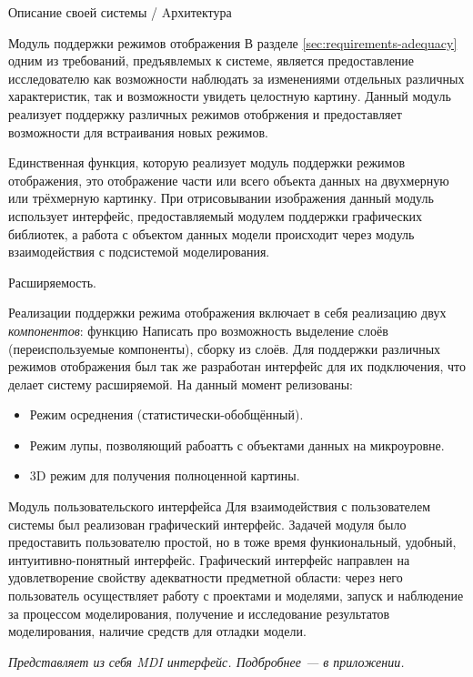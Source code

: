 \documentclass[a4paper,12pt]{extarticle}
\begin{document}
\begin{section}{Описание своей системы / Aрхитектура}
\begin{subsection}{Модуль поддержки режимов отображения}
    В разделе \ref{sec:requirements-adequacy} одним из требований, предъявлемых к системе, является предоставление исследователю как возможности наблюдать за изменениями отдельных различных характеристик, так и возможности увидеть целостную картину. Данный модуль реализует поддержку различных режимов отобржения и предоставляет возможности для встраивания новых режимов.

    Единственная функция, которую реализует модуль поддержки режимов отображения, это отображение части или всего объекта данных на двухмерную или трёхмерную картинку. При отрисовывании изображения данный модуль использует интерфейс, предоставляемый модулем поддержки графических библиотек, а работа с объектом данных модели происходит через модуль взаимодействия с подсистемой моделирования. 

    Расширяемость.

    Реализации поддержки режима отображения включает в себя реализацию двух \textit{компонентов}: функцию
    Написать про возможность выделение слоёв (переиспользуемые компоненты), сборку из слоёв.
    Для поддержки различных режимов отображения был так же разработан интерфейс для их подключения, что делает систему расширяемой. На данный момент релизованы:
    \begin{itemize}
        \item Режим осреднения (статистически-обобщённый).
        \item Режим лупы, позволяющий рабоатть с объектами данных на микроуровне.
        \item 3D режим для получения полноценной картины.
    \end{itemize}
\end{subsection}

\begin{subsection}{Модуль пользовательского интерфейса}
    Для взаимодействия с пользователем системы был реализован графический интерфейс. Задачей модуля было предоставить пользователю простой, но в тоже время функиональный, удобный, интуитивно-понятный интерфейс. Графический интерфейс направлен на удовлетворение свойству адекватности предметной области: через него пользователь осуществляет работу с проектами и моделями, запуск и наблюдение за процессом моделирования, получение и исследование результатов моделирования, наличие средств для отладки модели.
    
    \textit{Представляет из себя MDI интерфейс. Подбробнее --- в приложении.}
\end{subsection}

\end{section}
\end{document}
